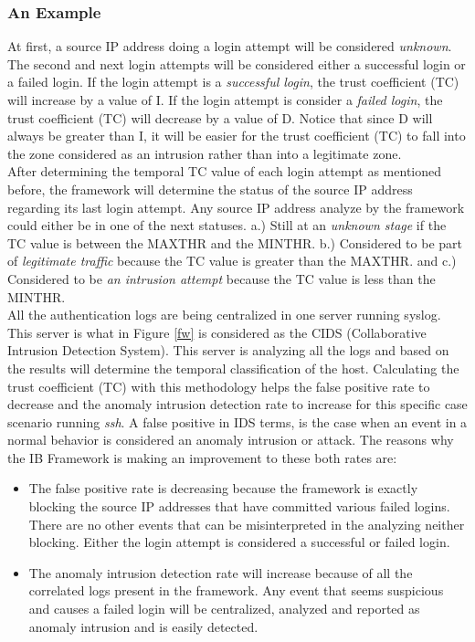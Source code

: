 \documentclass[conference]{IEEEtran}
\begin{document}
\subsubsection{An Example}
At first, a source IP address doing a login attempt will be considered \emph{unknown}. The second and next login attempts will be considered either a successful login or a failed login.  If the login attempt is a \emph{successful login}, the trust coefficient (TC) will increase by a value of I. If the login attempt is consider a \emph{failed login}, the trust coefficient (TC) will decrease by a value of D. Notice that since D will always be greater than I, it will be easier for the trust coefficient (TC) to fall into the zone considered as an intrusion rather than into a legitimate zone. \\
After determining the temporal TC value of each login attempt as mentioned before, the framework will determine the status of the source IP address regarding its last login attempt. Any source IP address analyze by the framework could either be in one of the next statuses. a.) Still at an \emph{unknown stage} if the TC value is between the MAXTHR and the MINTHR. b.) Considered to be part of \emph{legitimate traffic} because the TC value is greater than the MAXTHR. and c.) Considered to be \emph{an intrusion attempt} because the TC value is less than the MINTHR.\\

All the authentication logs are being centralized in one server running syslog. This server is what in Figure \ref{fw} is considered as the CIDS (Collaborative Intrusion Detection System). This server is analyzing all the logs and based on the results will determine the temporal classification of the host. Calculating the trust coefficient (TC) with this methodology helps the false positive rate to decrease and the anomaly intrusion detection rate to increase for this specific case scenario running \emph{ssh}. A false positive in IDS terms, is the case when an event in a normal behavior is considered an anomaly intrusion or attack. The reasons why the IB Framework is making an improvement to these both rates are:

\begin{itemize}
\item The false positive rate is decreasing because the framework is exactly blocking the source IP addresses that have committed various failed logins. There are no other events that can be misinterpreted in the analyzing neither blocking. Either the login attempt is considered a successful or failed login. 
\item The anomaly intrusion detection rate will increase because of all the correlated logs present in the framework. Any event that seems suspicious and causes a failed login will be centralized, analyzed and reported as anomaly intrusion and is easily detected.   
\end{itemize}
\end{document}
